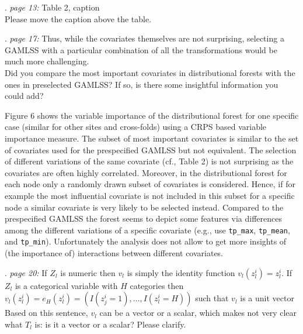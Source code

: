\documentclass[american,foldmarks=false,noconfig]{uibklttr}
\let\code=\texttt
\newenvironment{review}{\fontshape{\itdefault}\fontseries{\bfdefault} \selectfont \smallskip}{\par}
\begin{document}
\begin{review}
14. {\color{quotecolor}\textit{page 13:} Table 2, caption}\\
Please move the caption above the table.
\end{review}


\begin{review}
15. {\color{quotecolor}\textit{page 17:} Thus, while the covariates 
themselves are not surprising, selecting a GAMLSS with a particular 
combination of all the transformations would be much more challenging.}\\
Did you compare the most important covariates in distributional forests
with the ones in preselected GAMLSS? If so, is there some insightful
information you could add?
\end{review}

Figure 6 shows the variable importance of the distributional forest
for one specific case (similar for other sites and cross-folds) 
using a CRPS based variable importance measure. The subset of 
most important covariates is similar to the set of covariates 
used for the prespecified GAMLSS but not equivalent.
The selection of different variations of the same covariate (cf., Table 2)
is not surprising as the covariates are often highly correlated.
Moreover, in the distributional forest for each node only a randomly
drawn subset of covariates is considered. Hence, if for example the most 
influential covariate is not included in this subset for a specific node 
a similar covariate is very likely to be selected instead.
Compared to the prespecified GAMLSS the forest seems to depict some
features via differences among the different variations of a specific
covariate (e.g., use \code{tp\_max}, \code{tp\_mean}, and \code{tp\_min}).
Unfortunately the analysis does not allow to get more insights
of (the importance of) interactions between different covariates.


\begin{review}
16. {\color{quotecolor}\textit{page 20:} If $Z_l$ is numeric 
then $v_l$ is simply the identity function $v_l(z_l^i) = z_l^i$. 
If $Z_l$ is a categorical variable with $H$ categories then 
$v_l(z_l^i) = e_H(z_l^i) = (I(z_j^i = 1), \dots , I(z_l^i = H))$ 
such that $v_l$ is a unit vector}\\
Based on this sentence, $v_l$ can be a vector or a scalar, 
which makes not very clear what $T_l$ is: is it a vector 
or a scalar? Please clarify.
\end{review}
\end{document}
